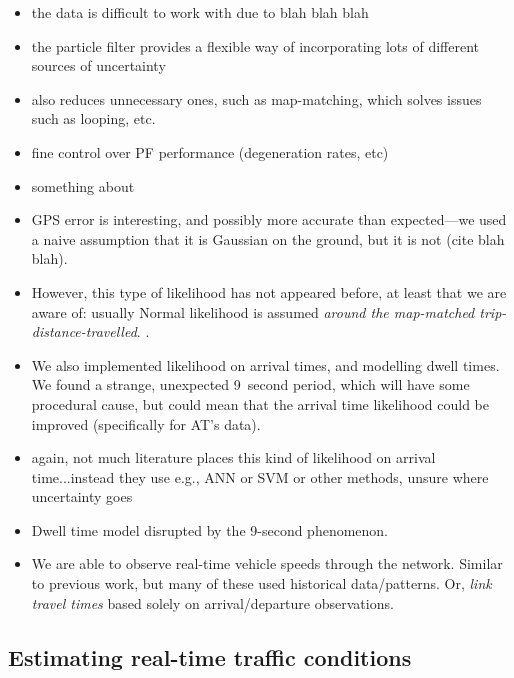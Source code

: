 \begin{itemize}
  \item the data is difficult to work with due to blah blah blah
  \item the particle filter provides a flexible way of incorporating lots of different sources of uncertainty
  \item also reduces unnecessary ones, such as map-matching, which solves issues such as looping, etc.
  \item fine control over PF performance (degeneration rates, etc)
  \item something about \citet{Hans_2015}

  \item GPS error is interesting, and possibly more accurate than expected---we used a na\:ive assumption that it is Gaussian on the ground, but it is not (cite blah blah).
  \item However, this type of likelihood has not appeared before, at least that we are aware of: usually Normal likelihood is assumed \emph{around the map-matched trip-distance-travelled}. .

  \item We also implemented likelihood on arrival times, and modelling dwell times. We found a strange, unexpected 9~second period, which will have some procedural cause, but could mean that the arrival time likelihood could be improved (specifically for AT's data).
  \item again, not much literature places this kind of likelihood on arrival time...instead they use e.g., ANN or SVM or other methods, unsure where uncertainty goes

  \item Dwell time model disrupted by the 9-second phenomenon.

  \item We are able to observe real-time vehicle speeds through the network. Similar to previous work, but many of these used historical data/patterns. Or, \emph{link travel times} based solely on arrival/departure observations.
\end{itemize}


\subsection{Estimating real-time traffic conditions}

